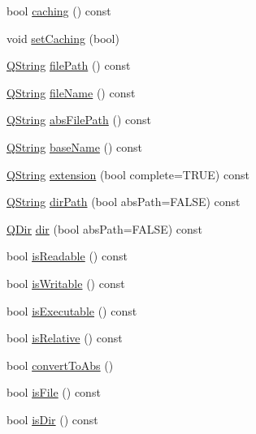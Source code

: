 \begin{DoxyCompactItemize}
\item 
bool \mbox{\hyperlink{class_q_file_info_adf5d4a3e1c616dde6d932eaa9d7bce91}{caching}} () const
\item 
void \mbox{\hyperlink{class_q_file_info_a9f2d5de0b83ff0c42b0004574ec9ddf5}{set\+Caching}} (bool)
\item 
\mbox{\hyperlink{class_q_string}{Q\+String}} \mbox{\hyperlink{class_q_file_info_af3dc855c31853287a4f4a17a18d68bc2}{file\+Path}} () const
\item 
\mbox{\hyperlink{class_q_string}{Q\+String}} \mbox{\hyperlink{class_q_file_info_a4f6795e14c6dc89e4a54d7b5cad9d03f}{file\+Name}} () const
\item 
\mbox{\hyperlink{class_q_string}{Q\+String}} \mbox{\hyperlink{class_q_file_info_a762ffb9217db04495831537e38db1bde}{abs\+File\+Path}} () const
\item 
\mbox{\hyperlink{class_q_string}{Q\+String}} \mbox{\hyperlink{class_q_file_info_a17e986f20da0f2f8239fb99c5b6ecd27}{base\+Name}} () const
\item 
\mbox{\hyperlink{class_q_string}{Q\+String}} \mbox{\hyperlink{class_q_file_info_aea9896c7746e79f76b66b1bd71631520}{extension}} (bool complete=T\+R\+UE) const
\item 
\mbox{\hyperlink{class_q_string}{Q\+String}} \mbox{\hyperlink{class_q_file_info_ab31c5b7d4c01901e056fa456fd9863d1}{dir\+Path}} (bool abs\+Path=F\+A\+L\+SE) const
\item 
\mbox{\hyperlink{class_q_dir}{Q\+Dir}} \mbox{\hyperlink{class_q_file_info_ac3d8f896db959c0688ae38500c3712f3}{dir}} (bool abs\+Path=F\+A\+L\+SE) const
\item 
bool \mbox{\hyperlink{class_q_file_info_af8795a46c49f6911a14f66218949f213}{is\+Readable}} () const
\item 
bool \mbox{\hyperlink{class_q_file_info_ab2dcfc1ea9764ea5e6ea9cc684156c92}{is\+Writable}} () const
\item 
bool \mbox{\hyperlink{class_q_file_info_a5b834ba486c5f6da3b429751ee84fd12}{is\+Executable}} () const
\item 
bool \mbox{\hyperlink{class_q_file_info_ae1b2d0ad6ca05510092d0182e276a5d0}{is\+Relative}} () const
\item 
bool \mbox{\hyperlink{class_q_file_info_a3a4b0328b3fd423e0cfb0747445760b8}{convert\+To\+Abs}} ()
\item 
bool \mbox{\hyperlink{class_q_file_info_a6bc9021370d012084b9464ba22172d46}{is\+File}} () const
\item 
bool \mbox{\hyperlink{class_q_file_info_a91a725dd517a4b77b15077e72a7a1501}{is\+Dir}} () const

\end{DoxyCompactItemize}
